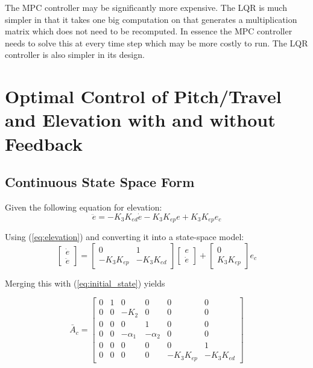The MPC controller may be significantly more expensive. The LQR is much simpler in that it takes one big computation on that generates a multiplication matrix which does not need to be recomputed. In essence the MPC controller needs to solve this at every time step which may be more costly to run. The LQR controller is also simpler in its design.


\section{Optimal Control of Pitch/Travel and Elevation with and without Feedback}
\subsection{Continuous State Space Form}
Given the following equation for elevation:
\begin{equation}\label{eq:elevation}
\ddot{e} = -K_3K_{ed}\dot{e} - K_3K_{ep}e +K_3K_{ep}e_c
\end{equation}

Using (\ref{eq:elevation}) and converting it into a state-space model:
$$
\begin{bmatrix}
\dot{e} \\
\ddot{e}
\end{bmatrix} = \begin{bmatrix}
0 & 1 \\
-K_3K_{ep} & -K_3K_{ed}
\end{bmatrix}\begin{bmatrix}
e \\
\dot{e}
\end{bmatrix}
+\begin{bmatrix}
0 \\
K_3K_{ep}
\end{bmatrix}e_c
$$

Merging this with (\ref{eq:initial_state}) yields

\begin{equation}
\bar{A}_c =
\begin{bmatrix}
    0 & 1 & 0 & 0 & 0 & 0 \\
    0 & 0 & -K_2 & 0 & 0 & 0 \\
    0 & 0 & 0 & 1 & 0 & 0 \\
    0 & 0 & -\alpha_1 & - \alpha_2 & 0 & 0 \\
    0 & 0 & 0 & 0 & 0 & 1 \\
    0 & 0 & 0 & 0 & -K_3K_{ep} & -K_3K_{ed}
\end{bmatrix}
\end{equation}

